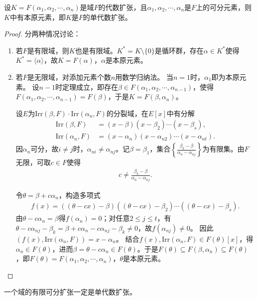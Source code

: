\documentclass[../../main.tex]{subfiles}%
\begin{document}
\begin{theorem}
设$K=F(\alpha_1,\alpha_2,\cdots,\alpha_n)$是域$F$的代数扩张，且$\alpha_1,\alpha_2,\cdots,\alpha_n$是$F$上的可分元素，则$K$中有本原元素，即$K$是$F$的单代数扩张。
\end{theorem}
\begin{proof}
分两种情况讨论：
\begin{enumerate}[(1)]
\item 若$F$是有限域，则$K$也是有限域。$K^*=K\setminus\{0\}$是循环群，存在$\alpha\in K^*$使得$K^*=\langle\alpha\rangle$，故$K=F(\alpha)$，$\alpha$是本原元素。
\item 若$F$是无限域，对添加元素个数$n$用数学归纳法。
当$n=1$时，$\alpha_1$即为本原元素。
设$n-1$时定理成立，即存在$\beta\in F(\alpha_1,\alpha_2,\cdots,\alpha_{n-1})$，使得$F(\alpha_1,\alpha_2,\cdots,\alpha_{n-1})=F(\beta)$，于是$K=F(\beta,\alpha_n)$。

设$E$为$\mathrm{Irr}(\beta,F)\cdot\mathrm{Irr}(\alpha_n,F)$的分裂域，在$E[x]$中有分解
\begin{align*}
\mathrm{Irr}(\beta,F)&=(x-\beta)(x-\beta_2)\cdots(x-\beta_s),\\
\mathrm{Irr}(\alpha_n,F)&=(x-\alpha_n)(x-\alpha_{n2})\cdots(x-\alpha_{nt}).
\end{align*}
因$\alpha_n$可分，故$i\neq j$时，$\alpha_{ni}\neq\alpha_{nj}$。记$\beta=\beta_1$，集合$\left\{\frac{\beta_k-\beta}{\alpha_n-\alpha_{nj}}\right\}$为有限集。由$F$无限，可取$c\in F$使得
\begin{align*}
c\neq\frac{\beta_k-\beta}{\alpha_n-\alpha_{nj}}.
\end{align*}

令$\theta=\beta+c\alpha_n$，构造多项式
\begin{align*}
f(x)=((\theta-cx)-\beta)((\theta-cx)-\beta_2)\cdots((\theta-cx)-\beta_s).
\end{align*}
由$\theta-c\alpha_n=\beta$得$f(\alpha_n)=0$；对任意$2\leqslant j\leqslant t$，有$\theta-c\alpha_{nj}-\beta_k=\beta+c\alpha_n-c\alpha_{nj}-\beta_k\neq0$，故$f(\alpha_{nj})\neq0$。
因此$(f(x),\mathrm{Irr}(\alpha_n,F))=x-\alpha_n$。
结合$f(x),\mathrm{Irr}(\alpha_n,F)\in F(\theta)[x]$，得$\alpha_n\in F(\theta)$，进而$\beta=\theta-c\alpha_n\in F(\theta)$。于是$F(\theta)\subseteq F(\beta,\alpha_n)\subseteq F(\theta)$，即$F(\theta)=F(\alpha_1,\alpha_2,\cdots,\alpha_n)$，$\theta$是本原元素。
\end{enumerate}
\end{proof}

\begin{corollary}
一个域的有限可分扩张一定是单代数扩张。
\end{corollary}
\end{document}
